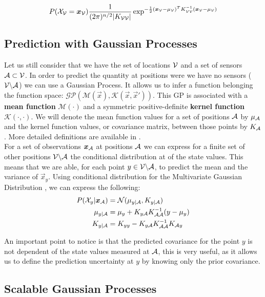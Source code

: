 \begin{equation}
    P(\mathcal{X}_{\mathcal{V}} = {\boldsymbol{{x}}}_{\mathcal{V}}) \frac{1}{(2\pi)^{n/2} |K_{\mathcal{V}\mathcal{V}}|} \exp^{-\frac{1}{2}({\boldsymbol{{x}}}_{\mathcal{V}} - \mu_{\mathcal{V}})^T K_{\mathcal{V}\mathcal{V}}^{-1} ({\boldsymbol{{x}}}_{\mathcal{V}} - \mu_{\mathcal{V}})}
\end{equation}


\subsection{Prediction with Gaussian Processes}
Let us still consider that we have the set of locations $\mathcal{V}$ and a set of sensors $\mathcal{A} \subset \mathcal{V}$. In order to predict the quantity at positions were we have no sensors ($\mathcal{V} \backslash \mathcal{A} $) we can use a Gaussian Process. It allows us to infer a function belonging the function space: $\mathcal{GP}(\mathcal{M}(\vec{x}), \mathcal{K}(\vec{x},\vec{x}'))$.  This GP is associated with a \textbf{mean function} $\mathcal{M}(\cdot)$ and a symmetric positive-definite \textbf{kernel function} $\mathcal{K}(\cdot,\cdot)$. We will denote the mean function values for a set of positions $\mathcal{A}$ by $\mu_{\mathcal{A}}$ and the kernel function values, or covariance matrix, between those points by $K_{\mathcal{A}}$. More detailed definitions are available in \citet[p.~13-16]{rasmussen_gaussian_2006}. \\

For a set of observations ${\boldsymbol{{x}}}_{\mathcal{A}}$ at positions $\mathcal{A}$ we can express for a finite set of other positions $\mathcal{V} \backslash \mathcal{A} $ the conditional distribution at of the state values. This means that we are able, for each point $y \in \mathcal{V} \backslash \mathcal{A} $, to predict the mean and the variance of $\vec{x}_y$. Using conditional distribution for the Multivariate Gaussian Distribution \citep[p.~193]{deisenroth_mathematics_2018}, we can express the following: 
\begin{align}
    P(\mathcal{X}_y | {\boldsymbol{{x}}}_{\mathcal{A}} ) &= \mathcal{N}(\mu_{y | \mathcal{A}}, K_{y | \mathcal{A}}) \\
    \mu_{y | \mathcal{A}} &= \mu_y + K_{y\mathcal{A}} K_{\mathcal{A}\mathcal{A}}^{-1} (y - \mu_y)\\ 
    K_{y | \mathcal{A}} &=  K_{yy} - K_{y\mathcal{A}} K_{\mathcal{A}\mathcal{A}}^{-1} K_{\mathcal{A} y} \label{equ:covGP}
\end{align}

An important point to notice is that the predicted covariance for the point $y$ is not dependent of the state values measured at $\mathcal{A}$, this is very useful, as it allows us to define the prediction uncertainty at $y$ by knowing only the prior covariance. \\

\subsection{Scalable Gaussian Processes} 

